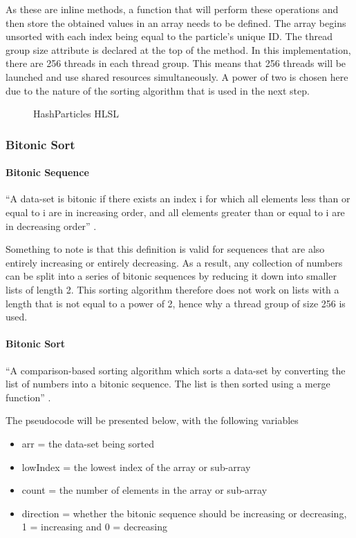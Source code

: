 \documentclass[a4paper, 12pt]{article}
\newcommand{\wideimage}[2][]{%
  \makebox[\textwidth][c]{\texttt{[image: \#2]}}%
}
\begin{document}
    As these are inline methods, a function that will perform these operations and then store the obtained values in an array needs to be defined. The array begins unsorted with each index being equal to the particle's unique ID. The thread group size attribute is declared at the top of the method. In this implementation, there are 256 threads in each thread group. This means that 256 threads will be launched and use shared resources simultaneously. A power of two is chosen here due to the nature of the sorting algorithm that is used in the next step.

    \begin{figure}[H]
        \begin{center}
            \wideimage[]{hashParticles.png}
            \caption{HashParticles HLSL}
        \end{center}
    \end{figure}

    \subsubsection{Bitonic Sort}
    
    \paragraph{Bitonic Sequence} ``A data-set is bitonic if there exists an index i for which all elements less than or equal to i are in increasing order, and all elements greater than or equal to i are in decreasing order'' \cite{bitonicyt}.

    Something to note is that this definition is valid for sequences that are also entirely increasing or entirely decreasing. As a result, any collection of numbers can be split into a series of bitonic sequences by reducing it down into smaller lists of length 2. This sorting algorithm therefore does not work on lists with a length that is not equal to a power of 2, hence why a thread group of size 256 is used.

    \paragraph{Bitonic Sort} ``A comparison-based sorting algorithm which sorts a data-set by converting the list of numbers into a bitonic sequence. The list is then sorted using a merge function'' \cite{bitonicyt}.

    The pseudocode will be presented below, with the following variables
    \begin{itemize}
        \item arr = the data-set being sorted
        \item lowIndex = the lowest index of the array or sub-array
        \item count = the number of elements in the array or sub-array
        \item direction = whether the bitonic sequence should be increasing or decreasing, 1 = increasing and 0 = decreasing
    \end{itemize}
\end{document}
